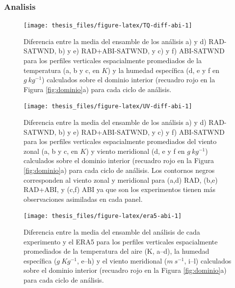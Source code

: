\documentclass[12pt,oneside]{reedthesis}
\begin{document}
\hypertarget{analisis}{%
\subsubsection{Analisis}\label{analisis}}


\begin{figure}

{\centering \texttt{[image: thesis\_files/figure-latex/TQ-diff-abi-1]} 

}

\caption{Diferencia entre la media del ensamble de los análisis a) y d) RAD-SATWND, b) y e) RAD+ABI-SATWND, y c) y f) ABI-SATWND para los perfiles verticales espacialmente promediados de la temperatura (a, b y c, en \(K\)) y la humedad específica (d, e y f en \(g\ kg^{-1}\)) calculados sobre el dominio interior (recuadro rojo en la Figura \ref{fig:dominio}a) para cada ciclo de análisis.}\label{fig:TQ-diff-abi}
\end{figure}

\begin{figure}

{\centering \texttt{[image: thesis\_files/figure-latex/UV-diff-abi-1]} 

}

\caption{Diferencia entre la media del ensamble de los análisis a) y d) RAD-SATWND, b) y e) RAD+ABI-SATWND, y c) y f) ABI-SATWND para los perfiles verticales espacialmente promediados del viento zonal (a, b y c, en \(K\)) y viento meridional (d, e y f en \(g\ kg^{-1}\)) calculados sobre el dominio interior (recuadro rojo en la Figura \ref{fig:dominio}a) para cada ciclo de análisis. Los contornos negros corresponden al viento zonal y meridional para (a,d) RAD, (b,e) RAD+ABI, y (c,f) ABI ya que son los experimentos tienen más observaciones asimiladas en cada panel.}\label{fig:UV-diff-abi}
\end{figure}

\begin{figure}

{\centering \texttt{[image: thesis\_files/figure-latex/era5-abi-1]} 

}

\caption{Diferencia entre la media del ensamble del análisis de cada experimento y el ERA5 para los perfiles verticales espacialmente promediados de la temperatura del aire (K, a--d), la humedad específica (\(g\ Kg^{-1}\), e--h) y el viento meridional (\(m\ s^{-1}\), i--l) calculados sobre el dominio interior (recuadro rojo en la Figura \ref{fig:dominio}a) para cada ciclo de análisis.}\label{fig:era5-abi}
\end{figure}
\end{document}
